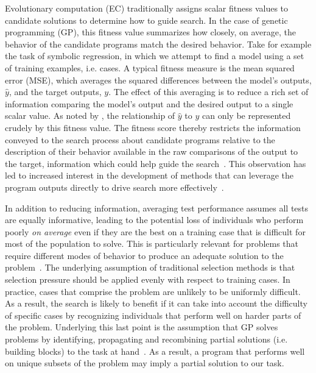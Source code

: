 \documentclass[twoside]{article}
\begin{document}
Evolutionary computation (EC) traditionally assigns scalar fitness values to candidate solutions to determine how to guide search. In the case of genetic programming (GP), this fitness value summarizes how closely, on average, the behavior of the candidate programs match the desired behavior. Take for example the task of symbolic regression, in which we attempt to find a model using a set of training examples, i.e. cases. A typical fitness measure is the mean squared error (MSE), which averages the squared differences between the model's outputs, $\hat{y}$, and the target outputs, $y$. The effect of this averaging is to reduce a rich set of information comparing the model's output and the desired output to a single scalar value. As noted by \cite{krawiec_behavioral_2016}, the relationship of $\hat{y}$ to $y$ can only be represented crudely by this fitness value. The fitness score thereby restricts the information conveyed to the search process about candidate programs relative to the description of their behavior available in the raw comparisons of the output to the target, information which could help guide the search~\citep{chrisgptp2015behavioral, krawiec_automatic_2015}. This observation has led to increased interest in the development of methods that can leverage the program outputs directly to drive search more effectively~\citep{vanneschi_survey_2014}.

In addition to reducing information, averaging test performance assumes all tests are equally informative, leading to the potential loss of individuals who perform poorly {\it on average} even if they are the best on a training case that is difficult for most of the population to solve. This is particularly relevant for problems that require different modes of behavior to produce an adequate solution to the problem~\citep{spector_assessment_2012}. The underlying assumption of traditional selection methods is that selection pressure should be applied evenly with respect to training cases. In practice, cases that comprise the problem are unlikely to be uniformly difficult. As a result, the search is likely to benefit if it can take into account the difficulty of specific cases by recognizing individuals that perform well on harder parts of the problem. Underlying this last point is the assumption that GP solves problems by identifying, propagating and recombining partial solutions (i.e. building blocks) to the task at hand~\citep{poli_schema_1998}. As a result, a program that performs well on unique subsets of the problem may imply a partial solution to our task. 
\end{document}
